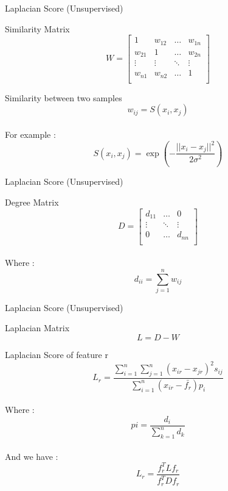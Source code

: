 \documentclass{beamer}
\begin{document}
\begin{frame}{Laplacian Score (Unsupervised)}

    \begin{block}{Similarity Matrix}
        \[ W = \begin{bmatrix}
            1 & w_{12} & \dots & w_{1n} \\
            w_{21} & 1 & \dots & w_{2n} \\
            \vdots & \vdots & \ddots & \vdots \\
            w_{n1} & w_{n2} & \dots & 1 \\
        \end{bmatrix} \]
    \end{block}

    \begin{block}{Similarity between two samples}
        \[ w_{ij} = S(x_i,x_j) \]
        \\
       For example :  \[ S(x_i,x_j) = \exp(-\frac{||x_i - x_j||^2}{2\sigma^2}) \]
    \end{block}
\end{frame}

\begin{frame}{Laplacian Score (Unsupervised)}

    \begin{block}{Degree Matrix}
        \[ D = \begin{bmatrix}
            d_{11} & \dots & 0 \\
            \vdots & \ddots & \vdots \\
            0 & \dots & d_{nn} \\
        \end{bmatrix} \]
        \\
        Where : \[ d_{ii} = \sum_{j=1}^n w_{ij} \]
    \end{block}
\end{frame}

\begin{frame}{Laplacian Score (Unsupervised)}
\begin{block}{Laplacian Matrix}
    \[ L = D - W \]
\end{block}

\begin{block}{Laplacian Score of feature r}
    \[
L_r = \frac{\sum_{i=1}^{n} \sum_{j=1}^{n} (x_{ir} - x_{jr})^2 s_{ij}}{\sum_{i=1}^{n} (x_{ir} - \bar{f_{r}}) p_{i}}
\]
\\ Where :  \[ pi = \frac{d_i}{\sum_{k=1}^{n}{d_k}} \]
\\ And we have :
    \[ L_r = \frac{f_r^T L f_r}{f_r^T D f_r} \]
\end{block}
\end{frame}
\end{document}
